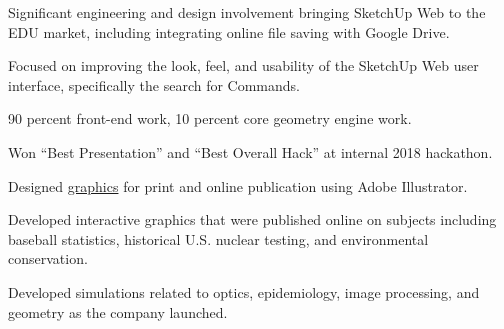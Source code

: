 \documentclass[]{mershon-two-column-resume}
\begin{document}
\begin{minipage}[t]{0.66\textwidth}
		\begin{tightemize}
			\item Significant engineering and design involvement bringing SketchUp Web to the EDU market, including integrating online file saving with Google Drive.
			\item Focused on improving the look, feel, and usability of the SketchUp Web user interface, specifically the search for Commands.
			\item 90 percent front-end work, 10 percent core geometry engine work. 
			\item Won ``Best Presentation'' and ``Best Overall Hack'' at internal 2018 hackathon.
		\end{tightemize}
		\sectionsep
		
		\begin{tightemize}
			\item Designed \href{https://github.com/bmershon/published-urls}{graphics} for print and online publication using Adobe Illustrator. \item Developed interactive graphics that were published online on subjects including baseball statistics, historical U.S. nuclear testing, and environmental conservation.
		\end{tightemize}
		\sectionsep
		
		\sectionsep
		
		\begin{tightemize}
			\item Developed simulations related to optics, epidemiology, image processing, and geometry as the company launched.
		\end{tightemize}
		\sectionsep
		
	\end{minipage} 
\end{document}
